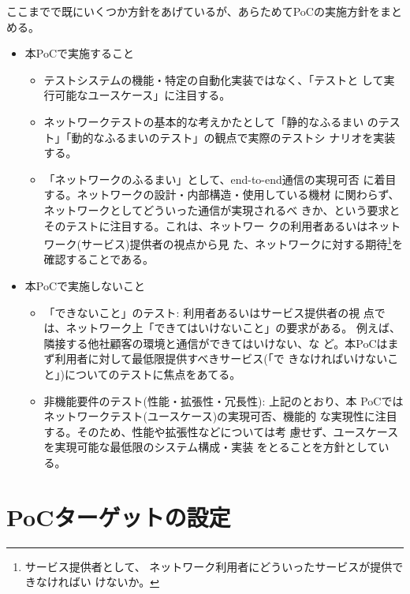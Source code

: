 ここまでで既にいくつか方針をあげているが、あらためてPoCの実施方針をまとめる。
\begin{itemize}
 \item 本PoCで実施すること
       \begin{itemize}
        \item テストシステムの機能・特定の自動化実装ではなく、「テストと
              して実行可能なユースケース」に注目する。
        \item ネットワークテストの基本的な考えかたとして「静的なふるまい
              のテスト」「動的なふるまいのテスト」の観点で実際のテストシ
              ナリオを実装する。
        \item 「ネットワークのふるまい」として、end-to-end通信の実現可否
              に着目する。ネットワークの設計・内部構造・使用している機材
              に関わらず、ネットワークとしてどういった通信が実現されるべ
              きか、という要求とそのテストに注目する。これは、ネットワー
              クの利用者あるいはネットワーク(サービス)提供者の視点から見
              た、ネットワークに対する期待\footnote{サービス提供者として、
              ネットワーク利用者にどういったサービスが提供できなければい
              けないか。}を確認することである。
       \end{itemize}
 \item 本PoCで実施しないこと
       \begin{itemize}
        \item 「できないこと」のテスト: 利用者あるいはサービス提供者の視
              点では、ネットワーク上「できてはいけないこと」の要求がある。
              例えば、隣接する他社顧客の環境と通信ができてはいけない、な
              ど。本PoCはまず利用者に対して最低限提供すべきサービス(「で
              きなければいけないこと」)についてのテストに焦点をあてる。
        \item 非機能要件のテスト(性能・拡張性・冗長性): 上記のとおり、本
              PoCではネットワークテスト(ユースケース)の実現可否、機能的
              な実現性に注目する。そのため、性能や拡張性などについては考
              慮せず、ユースケースを実現可能な最低限のシステム構成・実装
              をとることを方針としている。
       \end{itemize}
\end{itemize}

 \section{PoCターゲットの設定}

